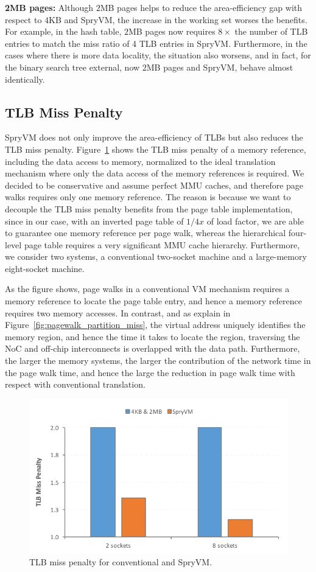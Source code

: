 \noindent\textbf{2MB pages:} Although $2$MB pages helps to reduce the area-efficiency gap with respect to $4$KB and SpryVM, the increase in the working set worses the benefits. For example, in the hash table, $2$MB pages now requires $8\times$ the number of TLB entries to match the miss ratio of 4 TLB entries in SpryVM. Furthermore, in the cases where there is more data locality, the situation also worsens, and in fact, for the binary search tree external, now $2$MB pages and SpryVM, behave almost identically.

\subsection{TLB Miss Penalty}

SpryVM does not only improve the area-efficiency of TLBs but also reduces the TLB miss penalty. Figure~\ref{fig:penalty} shows the TLB miss penalty of a memory reference, including the data access to memory, normalized to the ideal translation mechanism where only the data access of the memory references is required. We decided to be conservative and assume perfect MMU caches, and therefore page walks requires only one memory reference. The reason is because we want to decouple the TLB miss penalty benefits from the page table implementation, since in our case, with an inverted page table of $1/4x$ of load factor, we are able to guarantee one memory reference per page walk, whereas the hierarchical four-level page table requires a very significant MMU cache hierarchy. Furthermore, we consider two systems, a conventional two-socket machine and a large-memory eight-socket machine.

As the figure shows, page walks in a conventional VM mechanism requires a memory reference to locate the page table entry, and hence a memory reference requires two memory accesses. In contrast, and as explain in Figure~\ref{fig:pagewalk_partition_miss}, the virtual address uniquely identifies the memory region, and hence the time it takes to locate the region, traversing the NoC and off-chip interconnects is overlapped with the data path. Furthermore, the larger the memory systems, the larger the contribution of the network time in the page walk time, and hence the large the reduction in page walk time with respect with conventional translation. 

\begin{figure}[t]
	\centering
	\includegraphics[width=0.8\columnwidth]{graphs/penalty.pdf}
	\caption{TLB miss penalty for conventional and SpryVM.}
	\label{fig:penalty}
\end{figure}

